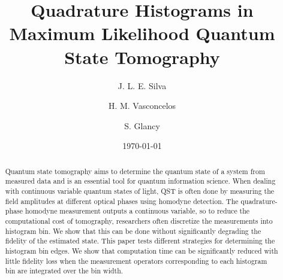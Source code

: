 \documentclass[
reprint,
superscriptaddress,
showpacs,
amsmath,
amssymb,
aps,
pra,
longbibliography
]{revtex4-1}
\begin{document}

\title{Quadrature Histograms in Maximum Likelihood Quantum State Tomography}%
\author{J. L. E. Silva}
\author{H. M. Vasconcelos}
\author{S. Glancy}


\date{\today}%

\begin{abstract}
  Quantum state tomography aims to determine the quantum state of a
  system from measured data and is an essential tool for quantum
  information science.  When dealing with continuous variable
  quantum states of light, QST is often done by measuring the field
  amplitudes at different optical phases using homodyne detection.
  The quadrature-phase homodyne measurement outputs a continuous
  variable, so to reduce the computational cost of tomography,
  researchers often discretize the measurements into histogram bin.
  We show that this can be done without significantly degrading the
  fidelity of the estimated state.  This paper tests different
  strategies for determining the histogram bin edges.
  We show that computation time can be significantly reduced with
    little fidelity loss when the measurement operators corresponding
    to each histogram bin are integrated over the bin width.
\end{abstract}

\maketitle
\end{document}
